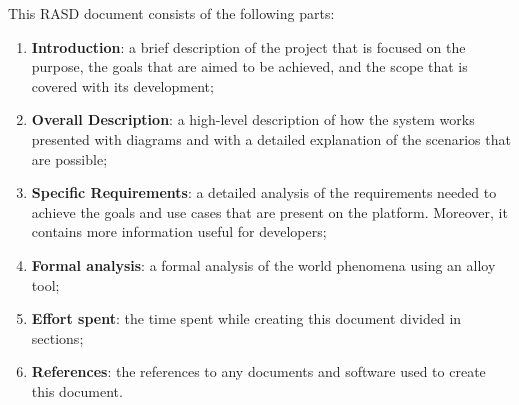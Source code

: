\renewcommand{\arraystretch}{1.6}
This RASD document consists of the following parts:
\begin{enumerate}
    \item \textbf{Introduction}: a brief description of the project that is focused on the purpose, the goals that are aimed to be achieved, and the scope that is covered with its development;
    \item \textbf{Overall Description}: a high-level description of how the system works presented with diagrams and with a detailed explanation of the scenarios that are possible;
    \item \textbf{Specific Requirements}: a detailed analysis of the requirements
    needed to achieve the goals and use cases that are present on the platform. Moreover, it contains more information useful for developers;
    \item \textbf{Formal analysis}: a formal analysis of the world phenomena using an alloy tool;
    \item \textbf{Effort spent}: the time spent while creating this document divided in sections;
    \item \textbf{References}: the references to any documents and software used to create this document.
\end{enumerate}